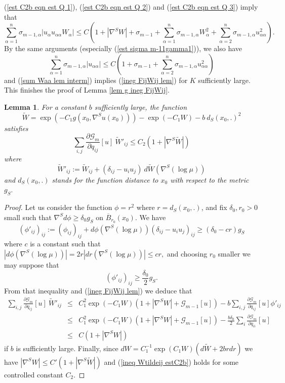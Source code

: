\documentclass[10pt,reqno,oneside]{amsart}
\newtheorem{lem}{Lemma}[section]
\theoremstyle{definition}
\theoremstyle{remark}
\begin{document}
(\ref{est C2b eqn est Q 1}), (\ref{est C2b eqn est Q 2}) and (\ref{est C2b eqn est Q 3}) imply that
$$\sum_{\alpha=1}^n\sigma_{m-1,\alpha}|u_{\alpha}u_{\alpha\alpha}W_{\alpha}|\leq C\left(1+|\nabla^SW|+\sigma_{m-1}+\sum_{\alpha=1}^n\sigma_{m-1,\alpha}W_{\alpha}^2+\sum_{\alpha=2}^n\sigma_{m-1,\alpha}u_{\alpha\alpha}^2\right).$$
By the same arguments (especially (\ref{est sigma m-11gamma1})), we also have
$$\sum_{\alpha=1}^n\sigma_{m-1,\alpha}|u_{\alpha\alpha}|\leq C\left(1+\sigma_{m-1}+\sum_{\alpha=2}^n\sigma_{m-1,\alpha}u_{\alpha\alpha}^2\right)$$
and (\ref{sum Waa lem interm}) implies (\ref{ineg FijWij lem}) for $K$ sufficiently large. This finishes the proof of Lemma \ref{lem g ineg FijWij}.
\begin{lem}\label{lem ineq Wtilde}
For a constant $b$ sufficiently large, the function
\begin{equation}\label{def Wtilde estC2b}
\widetilde{W}=\exp\left(-C_1g(x_0,\nabla^S u(x_0))\right)-\exp(-C_1W)-b\ d_S(x_0,.)^2
\end{equation}
satisfies
\begin{equation}\label{ineq Wtildeij estC2b}
\sum_{i,j}\frac{\partial\mathcal{G}_m}{\partial q_{ij}}[u]\ \widetilde{W}'_{ij}\leq C_2(1+|\nabla^S\widetilde{W}|)
\end{equation}
where
$$\widetilde{W}'_{ij}:=\widetilde{W}_{ij}+(\delta_{ij}-u_iu_j)\ d\widetilde{W}(\nabla^S(\log\mu))$$
and $d_S(x_0,.)$ stands for the function distance to $x_0$ with respect to the metric $g_S.$
\end{lem}
\begin{proof}
Let us consider the function $\phi=r^2$ where $r=d_S(x_0,.)$, and fix $\delta_0,r_0>0$ small such that $\nabla^Sd\phi\geq \delta_0 g_S$ on $\overline{B}_{r_0}(x_0).$ We have
$$(\phi'_{ij})_{ij}:=(\phi_{ij})_{ij}+d\phi(\nabla^S(\log\mu))(\delta_{ij}-u_iu_j)_{ij}\geq(\delta_0-cr)g_S$$
where $c$ is a constant such that $|d\phi(\nabla^S(\log\mu))|=2r|dr(\nabla^S(\log\mu))|\leq cr,$ and choosing $r_0$ smaller we may suppose that
$$(\phi'_{ij})_{ij}\geq\frac{\delta_0}{2} g_S.$$
From that inequality and (\ref{ineg FijWij lem}) we deduce that
\begin{eqnarray*}
\sum_{i,j}\frac{\partial\mathcal{G}_m}{\partial q_{ij}}[u]\ \widetilde{W}'_{ij}&\leq& C_1^2\exp(-C_1W)\left(1+|\nabla^SW|+\mathcal{G}_{m-1}[u]\right)-b\sum_{i,j}\frac{\partial\mathcal{G}_m}{\partial q_{ij}}[u]\phi'_{ij}\\
&\leq& C_1^2\exp(-C_1W)\left(1+|\nabla^SW|+\mathcal{G}_{m-1}[u]\right)-\frac{b\delta_0}{2}\sum_{i}\frac{\partial\mathcal{G}_m}{\partial q_{ii}}[u]\\
&\leq&C(1+|\nabla^SW|)
\end{eqnarray*}
if $b$ is sufficiently large. Finally, since $dW=C_1^{-1}\exp(C_1W)(d\widetilde{W}+2brdr)$ we have $|\nabla^SW|\leq  C'(1+|\nabla^S\widetilde{W}|)$ and (\ref{ineq Wtildeij estC2b}) holds for some controlled constant $C_2.$
\end{proof}
\end{document}
